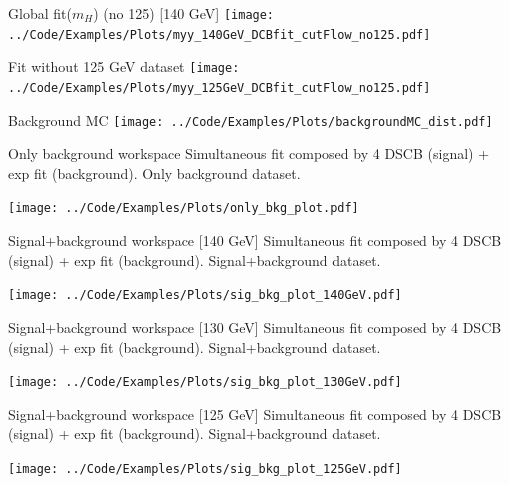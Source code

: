 \documentclass[10pt,UKenglish, leqno, xcolor = dvipsnames]{beamer}
\begin{document}
		\begin{frame}{Global fit($m_H$) (no 125) [140 GeV]}
			\vfill
			\texttt{[image: ../Code/Examples/Plots/myy\_140GeV\_DCBfit\_cutFlow\_no125.pdf]}
			\vfill
		\end{frame}
	
		\begin{frame}{Fit without 125 GeV dataset}
			\vfill
			\texttt{[image: ../Code/Examples/Plots/myy\_125GeV\_DCBfit\_cutFlow\_no125.pdf]}
			\vfill 
		\end{frame}
	
		\begin{frame}{Background MC}
			\vfill
			\texttt{[image: ../Code/Examples/Plots/backgroundMC\_dist.pdf]}
			\vfill 
		\end{frame}
	
		\begin{frame}{Only background workspace}
			\vfill
			Simultaneous fit composed by 4 DSCB (signal) + exp fit (background). Only background dataset.
			\begin{center}
				\texttt{[image: ../Code/Examples/Plots/only\_bkg\_plot.pdf]}
			\end{center}
			\vfill
		\end{frame}
	
		\begin{frame}{Signal+background workspace [140 GeV]}
			\vfill
			Simultaneous fit composed by 4 DSCB (signal) + exp fit (background). Signal+background dataset.
			\begin{center}
				\texttt{[image: ../Code/Examples/Plots/sig\_bkg\_plot\_140GeV.pdf]}
			\end{center}
			\vfill
		\end{frame}
	
		\begin{frame}{Signal+background workspace [130 GeV]}
			\vfill
			Simultaneous fit composed by 4 DSCB (signal) + exp fit (background). Signal+background dataset.
			\begin{center}
				\texttt{[image: ../Code/Examples/Plots/sig\_bkg\_plot\_130GeV.pdf]}
			\end{center}
			\vfill
		\end{frame}

		\begin{frame}{Signal+background workspace [125 GeV]}
			\vfill
			Simultaneous fit composed by 4 DSCB (signal) + exp fit (background). Signal+background dataset.
			\begin{center}
				\texttt{[image: ../Code/Examples/Plots/sig\_bkg\_plot\_125GeV.pdf]}
			\end{center}
			\vfill
		\end{frame}
	
\end{document}
